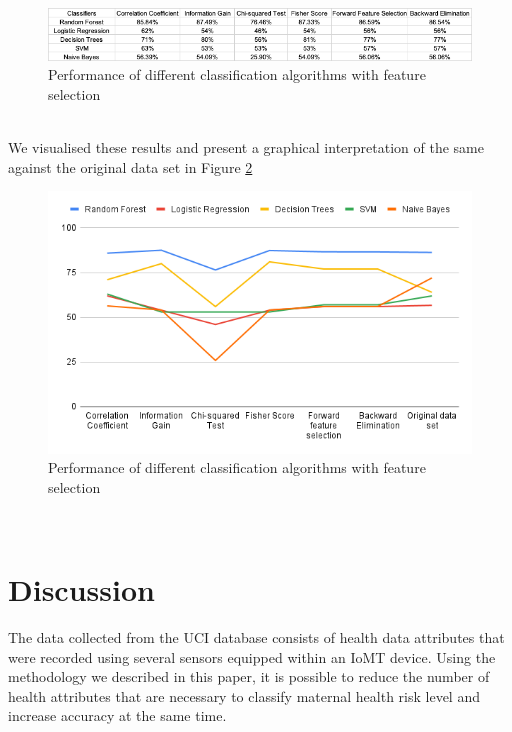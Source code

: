 \documentclass[conference]{IEEEtran}
\begin{document}
\begin{figure}[!h]
    \centering
    \includegraphics[width=\columnwidth]{IMG_3789.png}
    \caption{Performance of different classification algorithms with feature selection }
    \label{fig:classification1}
\end{figure}
\\
We visualised these results and present a graphical interpretation of the same against the original data set in Figure \ref{fig:classification2}
\begin{figure}[!h]
    \centering
    \includegraphics[width = \columnwidth]{chart (1).png}
    \caption{Performance of different classification algorithms with feature selection }
    \label{fig:classification2}
\end{figure}
\\
\section{Discussion}

The data collected from the UCI database consists of health data attributes that were recorded using several sensors equipped within an IoMT device. 
Using the methodology we described in this paper, it is possible to reduce the number of health attributes that are necessary to classify maternal health risk level and increase accuracy at the same time. 
\end{document}
